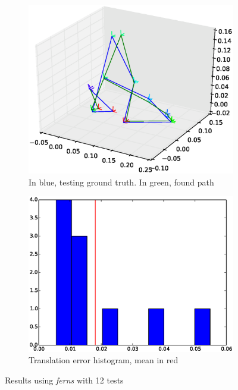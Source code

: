 \begin{figure}[htpb]
  \begin{subfigure}[b]{6cm}
          \includegraphics[width=\linewidth]{img/desktop_2_ferns_60_12_path_1.eps}
          \caption{In blue, testing ground truth. In green, found path}                
          \label{fig:desktop_2_ferns_path_1}
  \end{subfigure}   
  \qquad
  \begin{subfigure}[b]{6cm}
          \includegraphics[width=\linewidth]{img/desktop_2_ferns_60_12_dist_1.eps}
          \caption{Translation error histogram, mean in red} 
          \label{fig:desktop_2_ferns_dist_1}
  \end{subfigure}
  \caption{Results using \textit{ferns} with 12 tests}
\end{figure}


